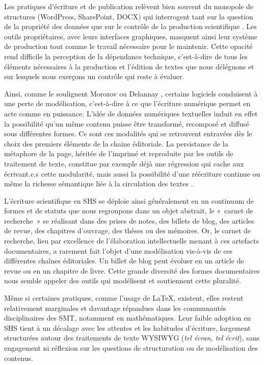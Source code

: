 \documentclass[final, fra]{anthology-ch}      %
\begin{document}
Les pratiques d'écriture et de publication relèvent bien souvent du
monopole de structures (WordPress, SharePoint, DOCX) qui interrogent
tant sur la question de la propriété des données que sur le contrôle de
la production scientifique \cite{porterWhyTechnologyMatters2003a}. Les
outils propriétaires, avec leurs interfaces graphiques, masquent ainsi
leur système de production tout comme le travail nécessaire pour le
maintenir. Cette opacité rend difficile la perception de la dépendance
technique, c'est-à-dire de tous les éléments nécessaires à la production
et l'édition de textes que nous déléguons et sur lesquels nous
exerçons un contrôle qui reste à évaluer.

Ainsi, comme le soulignent Morozov \cite{morozovPourToutResoudre2014} ou Delannay \cite{delannayEnvironnementsDecritureNumerique2025},
certains logiciels conduisent à une perte de modélisation, c'est-à-dire
à ce que l'écriture numérique permet en acte comme en puissance. L'idée
de données numériques textuelles induit en effet la possibilité qu'un
même contenu puisse être transformé, recomposé et diffusé sous
différentes formes. Ce sont ces modalités qui se retrouvent entravées
dès le choix des premiers éléments de la chaine éditoriale. La
persistance de la métaphore de la page, héritée de l'imprimé et
reproduite par les outils de traitement de texte, constitue par exemple
déjà une régression \cite{dehutFinirAvecWord2018}
qui cache aux écrivant.e.s cette modularité, mais aussi la possibilité
d'une réécriture continue ou même la richesse sémantique liée à la
circulation des textes \cite{cotteConceptDocumentNumerique2004b, nelsonLiteraryMachines1987a, gesslerSkeuomorphsCulturalAlgorithms1998a, blancTechnologiesLeditionNumerique2018a}.

L'écriture scientifique en SHS se déploie ainsi généralement en un
continuum de formes et de statuts que nous regroupons dans un objet
abstrait, le «~carnet de recherche~» se réalisant dans des prises de
notes, des billets de blog, des articles de revue, des chapitres
d'ouvrage, des thèses ou des mémoires. Or, le carnet de recherche, lieu
par excellence de l'élaboration intellectuelle menant à ces artefacts
documentaires, a rarement fait l'objet d'une modélisation vis-à-vis de
ces différentes chaînes éditoriales. Un billet de blog peut évoluer en
un article de revue ou en un chapitre de livre. Cette grande diversité
des formes documentaires nous semble appeler des outils qui modélisent
et soutiennent cette pluralité.

Même si certaines pratiques, comme l'usage de LaTeX, existent, elles
restent relativement marginales et davantage répandues dans les
communautés disciplinaires des SMT, notamment en mathématiques. Leur
faible adoption en SHS tient à un décalage avec les attentes et les
habitudes d'écriture, largement structurées autour des traitements de
texte WYSIWYG (\emph{tel écran, tel écrit}), sans engagement ni
réflexion sur les questions de structuration ou de modélisation des
contenus.
\end{document}
